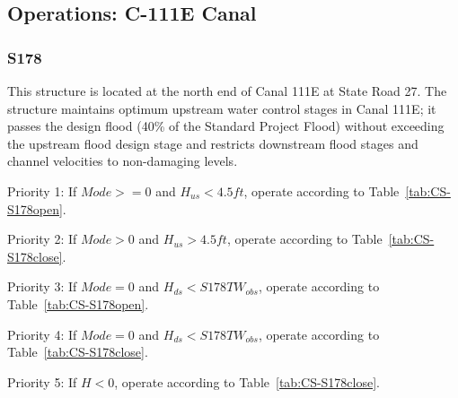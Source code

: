 \clearpage
\subsection{Operations: C-111E Canal}

\subsubsection{S178}
This structure is located at the north end of Canal 111E at State Road 27. The structure maintains optimum upstream water control stages in Canal 111E; it passes the design flood (40\% of the Standard Project Flood) without exceeding the upstream flood design stage and restricts downstream flood stages and channel velocities to non-damaging levels.



\textcolor[rgb]{1.00,0.00,0.00}{
\begin{packed_items}
\item Priority 1: If $Mode>=0$ and $H_{us}<4.5 ft$, operate according to Table~\ref{tab:CS-S178open}.
\item Priority 2: If $Mode>0$ and $H_{us}>4.5 ft$, operate according to Table~\ref{tab:CS-S178close}.
\item[]
\item Priority 3: If $Mode=0$ and $H_{ds}<S178TW_{obs}$, operate according to Table~\ref{tab:CS-S178open}.
\item Priority 4: If $Mode=0$ and $H_{ds}<S178TW_{obs}$, operate according to Table~\ref{tab:CS-S178close}.
\item[]
\item Priority 5: If $H<0$, operate according to Table~\ref{tab:CS-S178close}.
\end{packed_items}
}

